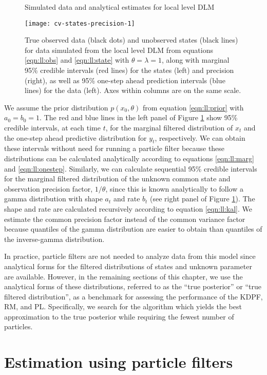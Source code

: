 \begin{figure}[ht]
\ssp
\centering
\caption{Simulated data and analytical estimates for local level DLM} \label{fig:comp:data}
\texttt{[image: cv-states-precision-1]}
\caption*{True observed data (black dots) and unobserved states (black lines) for data simulated from the local level DLM from equations \eqref{eqn:ll:obs} and \eqref{eqn:ll:state} with $\theta = \lambda = 1$, along with marginal 95\% credible intervals (red lines) for the states (left) and precision (right), as well as 95\% one-step ahead prediction intervals (blue lines) for the data (left). Axes within columns are on the same scale.}
\end{figure}

We assume the prior distribution $p(x_0,\theta)$ from equation \eqref{eqn:ll:prior} with $a_0 = b_0 = 1$. The red and blue lines in the left panel of Figure \ref{fig:comp:data} show 95\% credible intervals, at each time $t$, for the marginal filtered distribution of $x_t$ and the one-step ahead predictive distribution for $y_t$, respectively. We can obtain these intervals without need for running a particle filter because these distributions can be calculated analytically according to equations \eqref{eqn:ll:marg} and \eqref{eqn:ll:onestep}. Similarly, we can calculate sequential 95\% credible intervals for the marginal filtered distribution of the unknown common state and observation precision factor, $1/\theta$, since this is known analytically to follow a gamma distribution with shape $a_t$ and rate $b_t$  (see right panel of Figure \ref{fig:comp:data}). The shape and rate are calculated recursively according to equation \eqref{eqn:ll:kal}. We estimate the common precision factor instead of the common variance factor because quantiles of the gamma distribution are easier to obtain than quantiles of the inverse-gamma distribution.

In practice, particle filters are not needed to analyze data from this model since analytical forms for the filtered distributions of states and unknown parameter are available. However, in the remaining sections of this chapter, we use the analytical forms of these distributions, referred to as the ``true posterior'' or ``true filtered distribution'', as a benchmark for assessing the performance of the KDPF, RM, and PL. Specifically, we search for the algorithm which yields the best approximation to the true posterior while requiring the fewest number of particles.

\section{Estimation using particle filters} \label{sec:comp:est}

